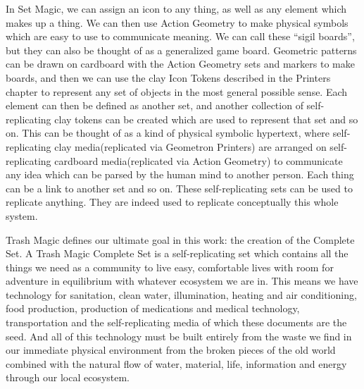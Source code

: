 In Set Magic, we can assign an icon to any thing, as well as any element which makes up a thing.  We can then use Action Geometry to make physical symbols which are easy to use to communicate meaning.  We can call these ``sigil boards'', but they can also be thought of as a generalized game board.  Geometric patterns can be drawn on cardboard with the Action Geometry sets and markers to make boards, and then we can use the clay Icon Tokens described in the Printers chapter to represent any set of objects in the most general possible sense.  Each element can then be defined as another set, and another collection of self-replicating clay tokens can be created which are used to represent that set and so on.  This can be thought of as a kind of physical symbolic hypertext, where self-replicating clay media(replicated via Geometron Printers) are arranged on self-replicating cardboard media(replicated via Action Geometry) to communicate any idea which can be parsed by the human mind to another person.  Each thing can be a link to another set and so on.  These self-replicating sets can be used to replicate anything.  They are indeed used to replicate conceptually this whole system.  

Trash Magic defines our ultimate goal in this work: the creation of the Complete Set.  A Trash Magic Complete Set is a self-replicating set which contains all the things we need as a community to live easy, comfortable lives with room for adventure in equilibrium with whatever ecosystem we are in.  This means we have technology for sanitation, clean water, illumination, heating and air conditioning, food production, production of medications and medical technology, transportation and the self-replicating media of which these documents are the seed.  And all of this technology must be built entirely from the waste we find in our immediate physical environment from the broken pieces of the old world combined with the natural flow of water, material, life, information and energy through our local ecosystem.  

